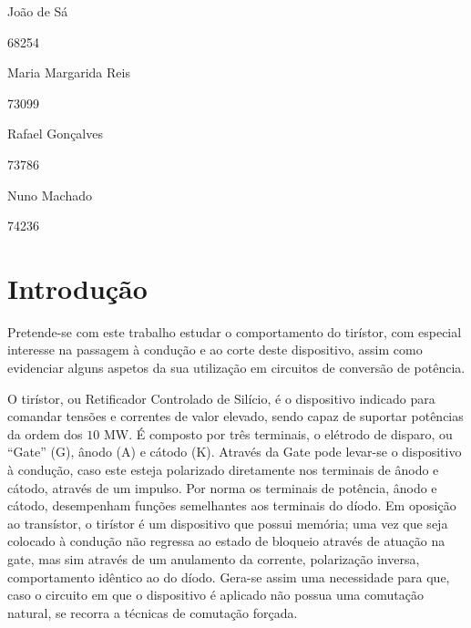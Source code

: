 \documentclass[a4paper,11pt]{article}
\begin{document}

	
	
	
	\trSetAuthors
	{
		\begin{center}
			João de Sá

			68254
		\end{center}
	}{
		\begin{center}
			Maria Margarida Reis

			73099
		\end{center}
	}{
		\begin{center}
			Rafael Gonçalves

			73786
		\end{center}
	}{
		\begin{center}
			Nuno Machado

			74236
		\end{center}
	}
		
	
	\trMakeCover
	
	\tableofcontents
	\pagebreak
	
	\section{Introdução}
	
	Pretende-se com este trabalho estudar o comportamento do tirístor, com especial interesse na passagem à condução e ao corte deste dispositivo, assim como evidenciar alguns aspetos da sua utilização em circuitos de conversão de potência.
	
	O tirístor, ou Retificador Controlado de Silício, é o dispositivo indicado para comandar tensões e correntes de valor elevado, sendo capaz de suportar potências da ordem dos $10$ MW. É composto por três terminais, o elétrodo de disparo, ou “Gate” (G), ânodo (A) e cátodo (K). Através da Gate pode levar-se o dispositivo à condução, caso este esteja polarizado diretamente nos terminais de ânodo e cátodo, através de um impulso. Por norma os terminais de potência, ânodo e cátodo, desempenham funções semelhantes aos terminais do díodo. Em oposição ao transístor, o tirístor é um dispositivo que possui memória; uma vez que seja colocado à condução não regressa ao estado de bloqueio através de atuação na gate, mas sim através de um anulamento da corrente, polarização inversa, comportamento idêntico ao do díodo. Gera-se assim uma necessidade para que, caso o circuito em que o dispositivo é aplicado não possua uma comutação natural, se recorra a técnicas de comutação forçada.
	
\end{document}
